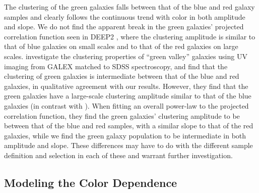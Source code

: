 \documentclass[]{emulateapj}
\begin{document}
The clustering of the green galaxies falls between that of the blue and
red galaxy samples and clearly follows the continuous trend with color in both
amplitude and slope.
We do not find the apparent break in the green galaxies' projected correlation 
function seen in DEEP2 \citep{coil07}, where the clustering amplitude is 
similar to that of blue galaxies on small scales and to that of the red 
galaxies on large scales.
\citet{loh09} investigate the clustering properties of ``green valley'' 
galaxies using UV imaging from GALEX matched to SDSS spectroscopy, and 
find that the clustering of green galaxies is intermediate between that of
the blue and red galaxies, in qualitative agreement with our results.
However, they find that the green galaxies have a large-scale 
clustering amplitude similar to that of the blue galaxies (in contrast with
\citealt{coil07}). When fitting an overall power-law to the projected 
correlation function, they find the green galaxies' clustering amplitude to 
be between that of the blue and red samples, with a similar slope to that 
of the red galaxies, while we find the green galaxy population to be 
intermediate in both amplitude and slope. These differences may have to
do with the different sample definition and selection in each of these
and warrant further investigation.

\subsection{Modeling the Color Dependence}
\label{subsec:hodcol}
\end{document}
